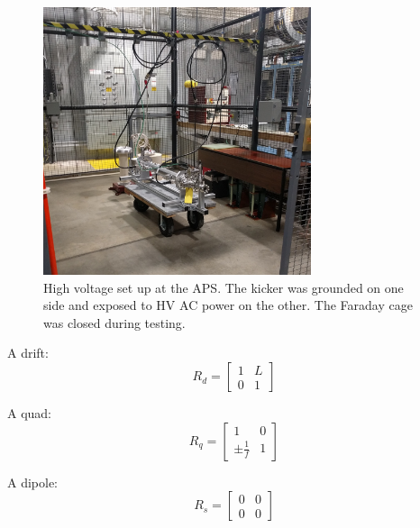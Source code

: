 \begin{figure}[h]
	\begin{center}
		\includegraphics[width=0.7\textwidth]{./images/kicker1}\caption{High voltage set up at the APS. The kicker was grounded on one side and exposed to HV AC power on the other. The Faraday cage was closed during testing. }
		\label{fig:AWAHVkicker}
	\end{center}
\end{figure}









A drift: 
\begin{equation}
R_d = 
\begin{bmatrix}
1 & L \\
0 & 1
\end{bmatrix}
\end{equation}

A quad: 
\begin{equation}
R_q = 
\begin{bmatrix}
1 & 0 \\
\pm \frac{1}{f} & 1
\end{bmatrix}
\end{equation}

A dipole:
\begin{equation}
R_s = 
\begin{bmatrix}
0 & 0 \\
0 & 0
\end{bmatrix}
\end{equation}

